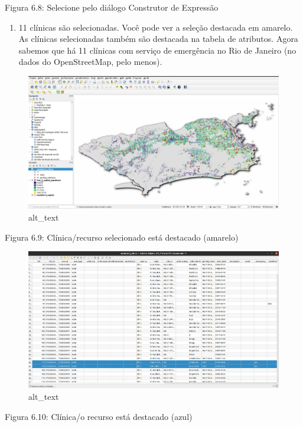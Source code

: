 \documentclass[
  portuguese,
]{krantz}
\providecommand{\tightlist}{%
  \setlength{\itemsep}{0pt}\setlength{\parskip}{0pt}}
\begin{document}
Figura 6.8: Selecione pelo diálogo Construtor de Expressão

\begin{enumerate}
\def\labelenumi{\arabic{enumi}.}
\setcounter{enumi}{2}
\tightlist
\item
  11 clínicas são selecionadas. Você pode ver a seleção destacada em amarelo. As clínicas selecionadas também são destacada na tabela de atributos. Agora sabemos que há 11 clínicas com serviço de emergência no Rio de Janeiro (no dados do OpenStreetMap, pelo menos).
\end{enumerate}

\begin{figure}
\centering
\includegraphics{media/modulo6/selected-canvas.png}
\caption{alt\_text}
\end{figure}

Figura 6.9: Clínica/recurso selecionado está destacado (amarelo)

\begin{figure}
\centering
\includegraphics{media/modulo6/selected-attr.png}
\caption{alt\_text}
\end{figure}

Figura 6.10: Clínica/o recurso está destacado (azul)
\end{document}
